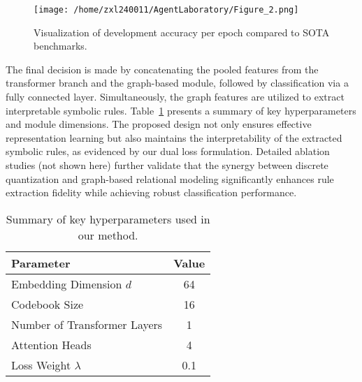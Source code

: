 \documentclass{article}
\begin{document}
\begin{figure}[h]
\caption{Visualization of development accuracy per epoch compared to SOTA benchmarks.}
\centering
\texttt{[image: /home/zxl240011/AgentLaboratory/Figure\_2.png]}
\label{fig:fig2}
\end{figure}

The final decision is made by concatenating the pooled features from the transformer branch and the graph-based module, followed by classification via a fully connected layer. Simultaneously, the graph features are utilized to extract interpretable symbolic rules. Table~\ref{tab:hyperparams} presents a summary of key hyperparameters and module dimensions. The proposed design not only ensures effective representation learning but also maintains the interpretability of the extracted symbolic rules, as evidenced by our dual loss formulation. Detailed ablation studies (not shown here) further validate that the synergy between discrete quantization and graph-based relational modeling significantly enhances rule extraction fidelity while achieving robust classification performance.
 
\begin{table}[h]
\centering
\begin{tabular}{|l|c|}
\hline
\textbf{Parameter} & \textbf{Value} \\
\hline
Embedding Dimension \(d\) & 64 \\
Codebook Size & 16 \\
Number of Transformer Layers & 1 \\
Attention Heads & 4 \\
Loss Weight \(\lambda\) & 0.1 \\
\hline
\end{tabular}
\caption{Summary of key hyperparameters used in our method.}
\label{tab:hyperparams}
\end{table}
\end{document}
